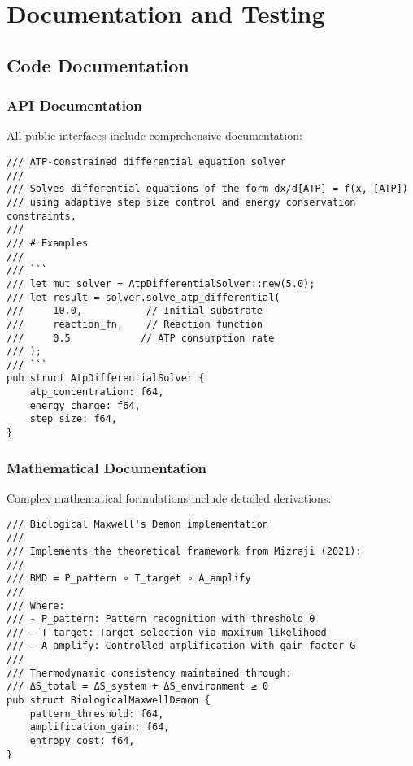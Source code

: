 \documentclass[12pt,a4paper]{article}
\begin{document}
\section{Documentation and Testing}

\subsection{Code Documentation}

\subsubsection{API Documentation}

All public interfaces include comprehensive documentation:

\begin{lstlisting}[style=ruststyle]
/// ATP-constrained differential equation solver
/// 
/// Solves differential equations of the form dx/d[ATP] = f(x, [ATP])
/// using adaptive step size control and energy conservation constraints.
///
/// # Examples
///
/// ```
/// let mut solver = AtpDifferentialSolver::new(5.0);
/// let result = solver.solve_atp_differential(
///     10.0,           // Initial substrate
///     reaction_fn,    // Reaction function
///     0.5            // ATP consumption rate
/// );
/// ```
pub struct AtpDifferentialSolver {
    atp_concentration: f64,
    energy_charge: f64,
    step_size: f64,
}
\end{lstlisting}

\subsubsection{Mathematical Documentation}

Complex mathematical formulations include detailed derivations:

\begin{lstlisting}[style=ruststyle]
/// Biological Maxwell's Demon implementation
///
/// Implements the theoretical framework from Mizraji (2021):
/// 
/// BMD = P_pattern ∘ T_target ∘ A_amplify
///
/// Where:
/// - P_pattern: Pattern recognition with threshold θ
/// - T_target: Target selection via maximum likelihood
/// - A_amplify: Controlled amplification with gain factor G
///
/// Thermodynamic consistency maintained through:
/// ΔS_total = ΔS_system + ΔS_environment ≥ 0
pub struct BiologicalMaxwellDemon {
    pattern_threshold: f64,
    amplification_gain: f64,
    entropy_cost: f64,
}
\end{lstlisting}
\end{document}
